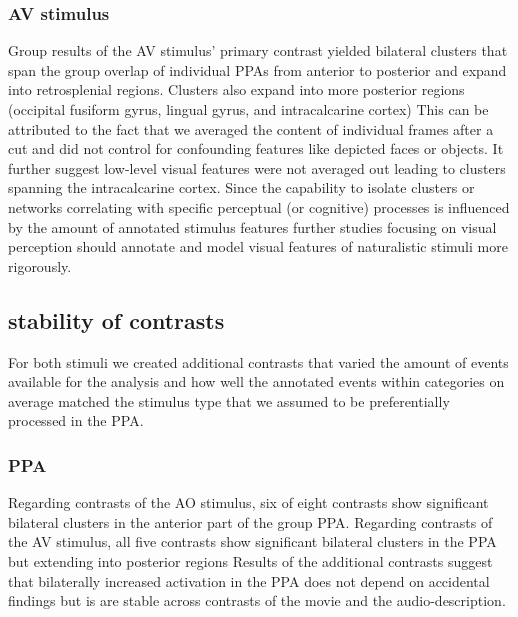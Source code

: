 \documentclass[english]{article}
\begin{document}
\subsubsection{AV stimulus}
Group results of the AV stimulus' primary contrast yielded bilateral clusters
that span the group overlap of individual PPAs from anterior to posterior and
expand into retrosplenial regions.
Clusters also expand into more posterior regions (occipital fusiform gyrus,
lingual gyrus, and intracalcarine cortex)
This can be attributed to the fact that we averaged the content of individual
frames after a cut and did not control for confounding features like depicted
faces or objects.
It further suggest low-level visual features were not averaged out leading to
clusters spanning the intracalcarine cortex.
Since the capability to isolate clusters or networks correlating with specific
perceptual (or cognitive) processes is influenced by the amount of annotated
stimulus features further studies focusing on visual perception should annotate
and model visual features of naturalistic stimuli more rigorously.


\subsection{stability of contrasts}


For both stimuli we created additional contrasts that varied the amount of
events available for the analysis and how well the annotated events within
categories on average matched the stimulus type that we assumed to be
preferentially processed in the PPA.

\subsubsection{PPA}
Regarding contrasts of the AO stimulus, six of eight contrasts show
significant bilateral clusters in the anterior part of the group PPA.
Regarding contrasts of the AV stimulus, all five contrasts show significant
bilateral clusters in the PPA but extending into posterior regions
Results of the additional contrasts suggest that bilaterally increased
activation in the PPA does not depend on accidental findings but is are stable
across contrasts of the movie and the audio-description.
\end{document}
